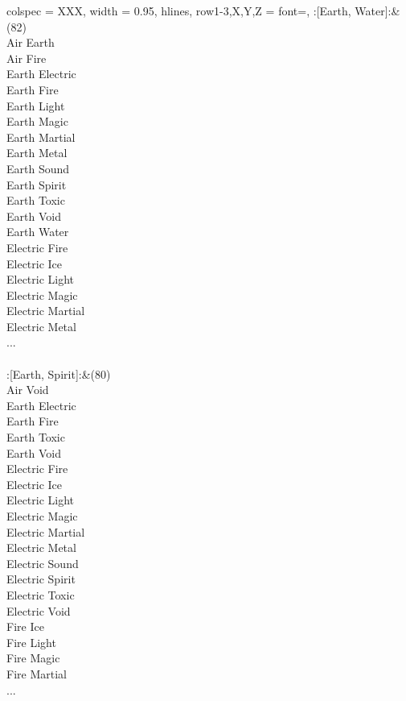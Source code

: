 \begin{longtblr}[
	caption = {2v2 Defending Weak},
	label = {2v2-Defending-Weak},
]{
	colspec = {XXX}, width = 0.95\linewidth,
	hlines,
	row{1-3,X,Y,Z} = {font=\bfseries},
}
	:[Earth, Water]:&{(82)\\
	Air Earth \\
	Air Fire \\
	Earth Electric \\
	Earth Fire \\
	Earth Light \\
	Earth Magic \\
	Earth Martial \\
	Earth Metal \\
	Earth Sound \\
	Earth Spirit \\
	Earth Toxic \\
	Earth Void \\
	Earth Water \\
	Electric Fire \\
	Electric Ice \\
	Electric Light \\
	Electric Magic \\
	Electric Martial \\
	Electric Metal \\
	...\\
	}\\

	:[Earth, Spirit]:&{(80)\\
	Air Void \\
	Earth Electric \\
	Earth Fire \\
	Earth Toxic \\
	Earth Void \\
	Electric Fire \\
	Electric Ice \\
	Electric Light \\
	Electric Magic \\
	Electric Martial \\
	Electric Metal \\
	Electric Sound \\
	Electric Spirit \\
	Electric Toxic \\
	Electric Void \\
	Fire Ice \\
	Fire Light \\
	Fire Magic \\
	Fire Martial \\
	...\\
	}\\


\end{longtblr}
